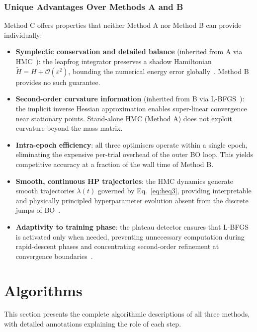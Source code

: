 \documentclass[11pt]{article}
\begin{document}
\subsubsection{Unique Advantages Over Methods A and B}

Method C offers properties that neither Method A nor Method B can
provide individually:

\begin{itemize}[leftmargin=*]
\item \textbf{Symplectic conservation and detailed balance} (inherited
      from A via HMC~\cite{betancourt2017,leimkuhler2004}): the
      leapfrog integrator preserves a shadow Hamiltonian
      $\tilde{H} = H + \mathcal{O}(\varepsilon^2)$, bounding the
      numerical energy error globally~\cite{hairer2006}.  Method B
      provides no such guarantee.

\item \textbf{Second-order curvature information} (inherited from B via
      L-BFGS~\cite{liu1989lbfgs}): the implicit inverse Hessian
      approximation enables super-linear convergence near stationary
      points.  Stand-alone HMC (Method A) does not exploit curvature
      beyond the mass matrix.

\item \textbf{Intra-epoch efficiency}: all three optimisers operate
      within a single epoch, eliminating the expensive per-trial
      overhead of the outer BO loop.  This yields competitive
      accuracy at a fraction of the wall time of Method B.

\item \textbf{Smooth, continuous HP trajectories}: the HMC dynamics
      generate smooth trajectories $\lambda(t)$ governed by
      Eq.~\eqref{eq:heq3}, providing interpretable and physically
      principled hyperparameter evolution absent from the discrete
      jumps of BO~\cite{zhang2025}.

\item \textbf{Adaptivity to training phase}: the plateau detector
      ensures that L-BFGS is activated only when needed, preventing
      unnecessary computation during rapid-descent phases and
      concentrating second-order refinement at convergence
      boundaries~\cite{rathore2024,kiyani2025}.
\end{itemize}
\section{Algorithms}
This section presents the complete algorithmic descriptions of all
three methods, with detailed annotations explaining the role of each
step.
\end{document}
